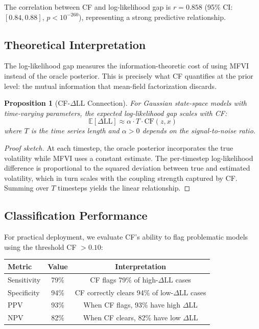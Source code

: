 \documentclass[10pt]{article} %
\theoremstyle{plain}
\newtheorem{proposition}[theorem]{Proposition}
\theoremstyle{definition}
\newcommand{\CF}{\mathrm{CF}}
\begin{document}
The correlation between CF and log-likelihood gap is $r = 0.858$ (95\% CI: $[0.84, 0.88]$, $p < 10^{-260}$), representing a strong predictive relationship.

\subsection{Theoretical Interpretation}

The log-likelihood gap measures the information-theoretic cost of using MFVI instead of the oracle posterior. This is precisely what CF quantifies at the prior level: the mutual information that mean-field factorization discards.

\begin{proposition}[CF-$\Delta$LL Connection]
\label{prop:cf-ll}
For Gaussian state-space models with time-varying parameters, the expected log-likelihood gap scales with CF:
\begin{equation}
\mathbb{E}[\Delta\text{LL}] \approx \alpha \cdot T \cdot \CF(z, x)
\end{equation}
where $T$ is the time series length and $\alpha > 0$ depends on the signal-to-noise ratio.
\end{proposition}

\begin{proof}[Proof sketch]
At each timestep, the oracle posterior incorporates the true volatility while MFVI uses a constant estimate. The per-timestep log-likelihood difference is proportional to the squared deviation between true and estimated volatility, which in turn scales with the coupling strength captured by CF. Summing over $T$ timesteps yields the linear relationship.
\end{proof}

\subsection{Classification Performance}

For practical deployment, we evaluate CF's ability to flag problematic models using the threshold CF $> 0.10$:

\begin{center}
\begin{tabular}{lcc}
\toprule
Metric & Value & Interpretation \\
\midrule
Sensitivity & 79\% & CF flags 79\% of high-$\Delta$LL cases \\
Specificity & 94\% & CF correctly clears 94\% of low-$\Delta$LL cases \\
PPV & 93\% & When CF flags, 93\% have high $\Delta$LL \\
NPV & 82\% & When CF clears, 82\% have low $\Delta$LL \\
\bottomrule
\end{tabular}
\end{center}
\end{document}
